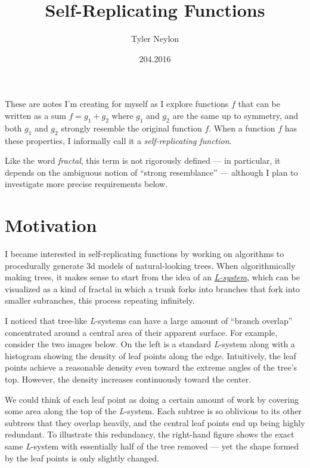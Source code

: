\documentclass[]{article}
\title{Self-Replicating Functions}
\author{Tyler Neylon}
\date{204.2016}
\begin{document}
\maketitle

These are notes I'm creating for myself as I explore functions \(f\)
that can be written as a sum \(f = g_1 + g_2\) where \(g_1\) and \(g_2\)
are the same up to symmetry, and both \(g_1\) and \(g_2\) strongly
resemble the original function \(f\). When a function \(f\) has these
properties, I informally call it a \emph{self-replicating function}.

Like the word \emph{fractal}, this term is not rigorously defined --- in
particular, it depends on the ambiguous notion of ``strong resemblance''
--- although I plan to investigate more precise requirements below.

\section{Motivation}\label{motivation}

I became interested in self-replicating functions by working on
algorithms to procedurally generate 3d models of natural-looking trees.
When algorithmically making trees, it makes sense to start from the idea
of an \href{https://en.wikipedia.org/wiki/L-system}{\emph{L-system}},
which can be visualized as a kind of fractal in which a trunk forks into
branches that fork into smaller subranches, this process repeating
infinitely.

I noticed that tree-like \emph{L}-systems can have a large amount of
``branch overlap'' concentrated around a central area of their apparent
surface. For example, consider the two images below. On the left is a
standard \emph{L}-system along with a histogram showing the density of
leaf points along the edge. Intuitively, the leaf points achieve a
reasonable density even toward the extreme angles of the tree's top.
However, the density increases continuously toward the center.

We could think of each leaf point as doing a certain amount of work by
covering some area along the top of the \emph{L}-system. Each subtree is
so oblivious to its other subtrees that they overlap heavily, and the
central leaf points end up being highly redundant. To illustrate this
redundancy, the right-hand figure shows the exact same \emph{L}-system
with essentially half of the tree removed --- yet the shape formed by
the leaf points is only slightly changed.
\end{document}
